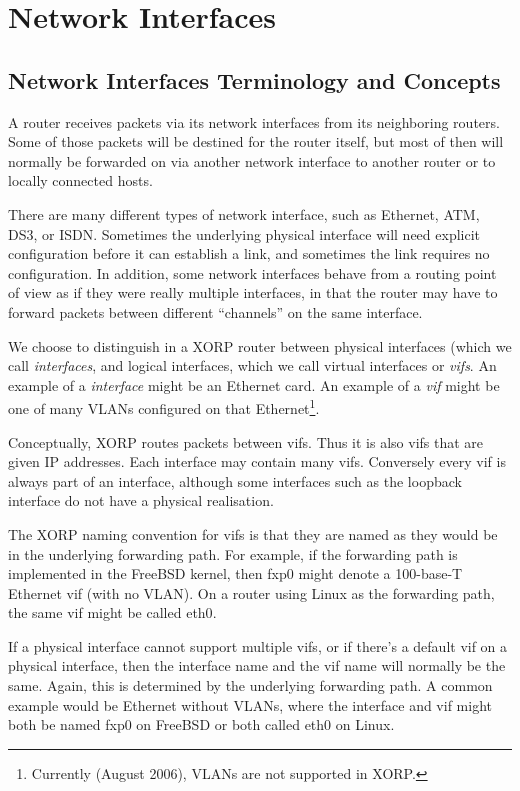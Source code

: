 %
%

\chapter{Network Interfaces}
\label{interfaces}
\section{Network Interfaces Terminology and Concepts}

A router receives packets via its network interfaces from its
neighboring routers.  Some of those packets will be destined for the
router itself, but most of then will normally be forwarded on via
another network interface to another router or to locally connected
hosts.

There are many different types of network interface, such as Ethernet,
ATM, DS3, or ISDN.  Sometimes the underlying physical interface will
need explicit configuration before it can establish a link, and
sometimes the link requires no configuration.  In addition, some
network interfaces behave from a routing point of view as if they were
really multiple interfaces, in that the router may have to forward
packets between different ``channels'' on the same interface.  

We choose to distinguish in a XORP router between physical interfaces
(which we call {\it interfaces}, and logical interfaces, which we call
virtual interfaces or {\it vifs}.  An example of a {\it interface}
might be an Ethernet card.  An example of a {\it vif} might be one of
many VLANs configured on that Ethernet\footnote{Currently (August 2006),
VLANs are not supported in XORP.}.

Conceptually, XORP routes packets between vifs.  Thus it is also vifs
that are given IP addresses.  Each interface may contain many vifs.
Conversely every vif is always part of an interface, although some
interfaces such as the loopback interface do not have a physical
realisation.

The XORP naming convention for vifs is that they are named as they
would be in the underlying forwarding path.  For example, if the
forwarding path is implemented in the FreeBSD kernel, then {\stt fxp0}
might denote a 100-base-T Ethernet vif (with no VLAN).  On a router
using Linux as the forwarding path, the same vif might be called {\stt
eth0}.  

If a physical interface cannot support multiple vifs, or if there's a
default vif on a physical interface, then the interface name and the
vif name will normally be the same.  Again, this is determined by the
underlying forwarding path.  A common example would be Ethernet
without VLANs, where the interface and vif might both be named {\stt
fxp0} on FreeBSD or both called {\stt eth0} on Linux.

